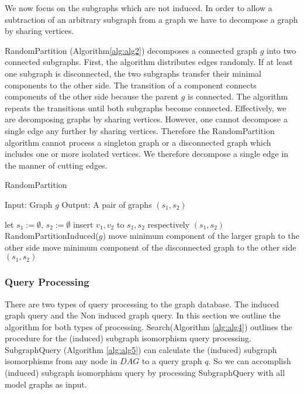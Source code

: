 We  now  focus on the subgraphs which are not induced. In order to allow a subtraction of an arbitrary subgraph from a graph we have to decompose a graph by sharing vertices.

RandomPartition (Algorithm\ref{alg:alg2}) decomposes a connected graph $g$ into two connected subgraphs.
First, the algorithm distributes edges randomly. If at least one subgraph is disconnected, the two subgraphs transfer their minimal components to the other side.
The transition of a component connects components of the other side because the parent $g$ is connected.
The algorithm repeats the transitions until both subgraphs become connected. Effectively, we are decomposing graphs by sharing vertices.
However, one  cannot decompose a single edge any further by sharing vertices. Therefore the RandomPartition algorithm cannot process a singleton graph or a disconnected graph which includes one or more isolated vertices. We therefore  decompose a single edge in the manner of cutting edges.

\begin{algorithm}
\caption{RandomPartition}
\label{alg:alg2}
\begin{algorithmic}
\STATE Input: Graph $g$
\STATE Output: A pair of graphs $(s_1, s_2)$
\end{algorithmic}
\begin{algorithmic}[1]
\STATE let $s_1 := \emptyset$, $s_2 := \emptyset$
	\STATE insert $v_1,v_2$ to $s_1,s_2$ respectively
\ELSE
	\STATE $(s_1, s_2)$ RandomPartitionInduced($g$)
			\STATE move minimum component of the larger graph to the other side
		\ELSE
			\STATE move minimum component of the disconnected graph to the other side
		\ENDIF
	\ENDWHILE
\ENDIF
\RETURN $(s_1,s_2)$
\end{algorithmic}
\end{algorithm}

\subsubsection{Query Processing}
There are two types of query processing to the graph database. The induced graph query and the Non induced graph query. In this section we outline the algorithm
 for both types of processing.
Search(Algorithm \ref{alg:alg4}) outlines the procedure for the (induced) subgraph isomorphism query processing.
SubgraphQuery (Algorithm \ref{alg:alg5}) can calculate the (induced) subgraph isomorphisms from any node in $DAG$ to a query graph $q$.
So we can accomplish (induced) subgraph isomorphism query by processing SubgraphQuery with all model graphs as input.

